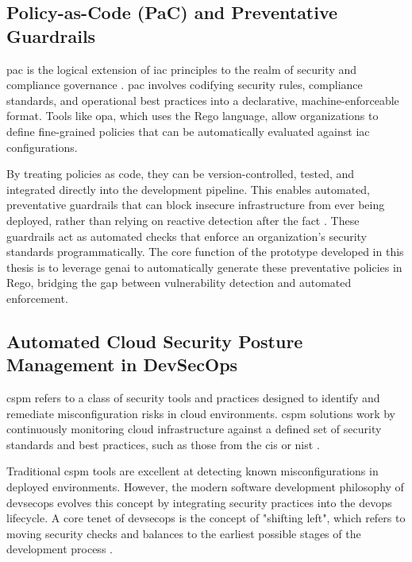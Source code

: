 \subsection{Policy-as-Code (PaC) and Preventative Guardrails}
\gls{pac} is the logical extension of \gls{iac} principles to the realm of security and compliance governance \cite{sarathe_krisshnan_jutoo_vijayaraghavan_policy_2025}. \gls{pac} involves codifying security rules, compliance standards, and operational best practices into a declarative, machine-enforceable format. Tools like \gls{opa}, which uses the Rego language, allow organizations to define fine-grained policies that can be automatically evaluated against \gls{iac} configurations.

By treating policies as code, they can be version-controlled, tested, and integrated directly into the development pipeline. This enables automated, preventative guardrails that can block insecure infrastructure from ever being deployed, rather than relying on reactive detection after the fact \cite{amazon_web_services_aws_2024}. These guardrails act as automated checks that enforce an organization's security standards programmatically. The core function of the prototype developed in this thesis is to leverage \gls{genai} to automatically generate these preventative policies in Rego, bridging the gap between vulnerability detection and automated enforcement.

\subsection{Automated Cloud Security Posture Management in DevSecOps}
\gls{cspm} refers to a class of security tools and practices designed to identify and remediate misconfiguration risks in cloud environments. \gls{cspm} solutions work by continuously monitoring cloud infrastructure against a defined set of security standards and best practices, such as those from the \gls{cis} or \gls{nist} \cite{tunc_cloud_2017}.

Traditional \gls{cspm} tools are excellent at detecting known misconfigurations in deployed environments. However, the modern software development philosophy of \gls{devsecops} evolves this concept by integrating security practices into the \gls{devops} lifecycle. A core tenet of \gls{devsecops} is the concept of "shifting left", which refers to moving security checks and balances to the earliest possible stages of the development process \cite{akto_shift_2025}.

